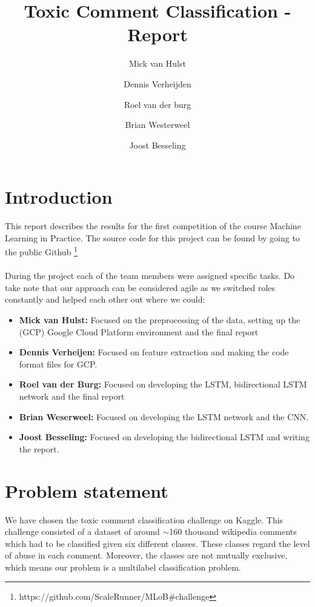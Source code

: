 \documentclass[10pt, a4paper]{article}
\title{Toxic Comment Classification - Report}
\author{Mick van Hulst \and Dennis Verheijden \and Roel van der burg \and Brian Westerweel \and Joost Besseling}
\begin{document}
	\maketitle
	
	
	\begin{multicols}{2}
	
	    \section{Introduction}
	    This report describes the results for the first competition of the course Machine Learning in Practice. The source code for this project can be found by going to the public Github \footnote{https://github.com/ScaleRunner/MLoB\#challenge}
	    \\
	    \\
	    During the project each of the team members were assigned specific tasks. Do take note that our approach can be considered agile as we switched roles constantly and helped each other out where we could:
	    \begin{itemize}
	        \item \textbf{Mick van Hulst:} Focused on the preprocessing of the data, setting up the (GCP) Google Cloud Platform environment and the final report
	        \item \textbf{Dennis Verheijen:} Focused on feature extraction and making the code format files for GCP.
	        \item \textbf{Roel van der Burg:} Focused on developing the LSTM, bidirectional LSTM network and the final report
	        \item \textbf{Brian Weserweel:} Focused on developing the LSTM network and the CNN.
	        \item \textbf{Joost Besseling:} Focused on developing the bidirectional LSTM and writing the report.
	    \end{itemize}
		
		\section{Problem statement}
		We have chosen the toxic comment classification challenge on Kaggle. This challenge consisted of a dataset of around $\sim$160 thousand wikipedia comments which had to be classified given six different classes. These classes regard the level of abuse in each comment. Moreover, the classes are not mutually exclusive, which means our problem is a multilabel classification problem.
		

\end{multicols}
\end{document}
